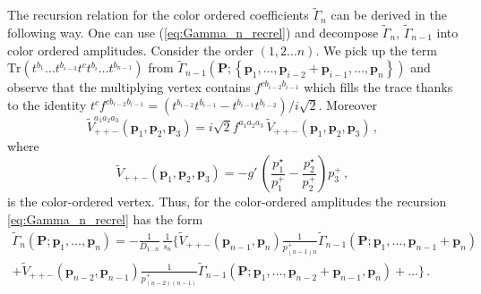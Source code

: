 \documentclass[english,american]{article}
\begin{document}
The recursion relation for the color ordered coefficients $\tilde{\Gamma}_{n}$ can
be derived in the following way. One can use (\ref{eq:Gamma_n_recrel})
and decompose $\tilde{\Gamma}_{n}$, $\tilde{\Gamma}_{n-1}$ into
color ordered amplitudes. Consider the order $\left(1,2\dots n\right)$.
We pick up the term $\mathrm{Tr}\left(t^{b_{1}}\dots t^{b_{i-3}}t^{c}t^{b_{i}}\dots t^{b_{n-1}}\right)$
from $\tilde{\Gamma}_{n-1}\left(\mathbf{P};\left\{ \mathbf{p}_{1},\dots,\mathbf{p}_{i-2}+\mathbf{p}_{i-1},\dots,\mathbf{p}_{n}\right\} \right)$
and observe that the multiplying vertex contains $f^{cb_{i-2}b_{i-1}}$
which fills the trace thanks to the identity $t^{c}f^{cb_{i-2}b_{i-1}}=\left(t^{b_{i-2}}t^{b_{i-1}}-t^{b_{i-1}}t^{b_{i-2}}\right)/i\sqrt{2}$.
Moreover
\begin{equation}
\tilde{V}_{++-}^{a_{1}a_{2}a_{3}}\left(\mathbf{p}_{1},\mathbf{p}_{2},\mathbf{p}_{3}\right)=i\sqrt{2}f^{a_{1}a_{2}a_{3}}\,\tilde{V}_{++-}\left(\mathbf{p}_{1},\mathbf{p}_{2},\mathbf{p}_{3}\right)\,,
\end{equation}
where
\begin{equation}
\tilde{V}_{++-}\left(\mathbf{p}_{1},\mathbf{p}_{2},\mathbf{p}_{3}\right)=-g'\,\left(\frac{p_{1}^{\star}}{p_{1}^{+}}-\frac{p_{2}^{\star}}{p_{2}^{+}}\right)p_{3}^{+}\,,
\end{equation}
is the color-ordered vertex. Thus, for the color-ordered amplitudes the
recursion \eqref{eq:Gamma_n_recrel} has the form
\begin{multline}
\tilde{\Gamma}_{n}\left(\mathbf{P};\mathbf{p}_{1},\dots,\mathbf{p}_{n}\right)=-\frac{1}{D_{1\dots n}}\,\frac{1}{s_{n}}\Bigg\{\tilde{V}_{++-}\left(\mathbf{p}_{n-1},\mathbf{p}_{n}\right)\frac{1}{p_{\left(n-1\right)n}^{+}}\tilde{\Gamma}_{n-1}\left(\mathbf{P};\mathbf{p}_{1},\dots,\mathbf{p}_{n-1}+\mathbf{p}_{n}\right)\\
+\tilde{V}_{++-}\left(\mathbf{p}_{n-2},\mathbf{p}_{n-1}\right)\frac{1}{p_{\left(n-2\right)\left(n-1\right)}^{+}}\tilde{\Gamma}_{n-1}\left(\mathbf{P};\mathbf{p}_{1},\dots,\mathbf{p}_{n-2}+\mathbf{p}_{n-1},\mathbf{p}_{n}\right)+\dots\Bigg\}\,.\label{eq:Gamma_n_recrel_colorord}
\end{multline}
\end{document}
